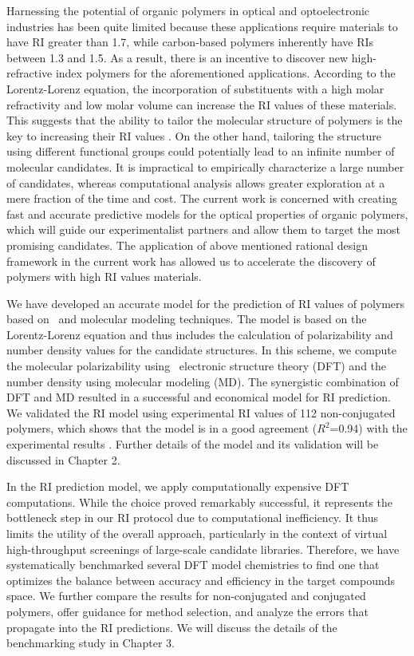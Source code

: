 Harnessing the potential of organic polymers in optical and optoelectronic industries has been quite limited because these applications require materials to have RI greater than 1.7, while carbon-based polymers inherently have RIs between 1.3 and 1.5. As a result, there is an incentive to discover new high-refractive index polymers for the aforementioned applications. According to the Lorentz-Lorenz equation, the incorporation of substituents with a high molar refractivity and low molar volume can increase the RI values of these materials. This suggests that the ability to tailor the molecular structure of polymers is the key to increasing their RI values \cite{Liu2009}. On the other hand, tailoring the structure using different functional groups could potentially lead to an infinite number of molecular candidates. It is impractical to empirically characterize a large number of candidates, whereas computational analysis allows greater exploration at a mere fraction of the time and cost. The current work is concerned with creating fast and accurate predictive models for the optical properties of organic polymers, which will guide our experimentalist partners and allow them to target the most promising candidates. The application of above mentioned rational design framework in the current work has allowed us to accelerate the discovery of polymers with high RI values materials.

We have developed an accurate model for the prediction of RI values of polymers based on \firstprinciples\ and molecular modeling techniques. The model is based on the Lorentz-Lorenz equation and thus includes the calculation of polarizability and number density values for the candidate structures. In this scheme, we compute the molecular polarizability using \firstprinciples\ electronic structure theory (DFT) and the number density using molecular modeling (MD). The synergistic combination of DFT and MD resulted in a successful and economical model for RI prediction. We validated the RI model using experimental RI values of 112 non-conjugated polymers, which shows that the model is in a good agreement ($R^2$=0.94) with the experimental results \cite{Afzal2018a}. Further details of the model and its validation will be discussed in Chapter 2.

In the RI prediction model, we apply computationally expensive DFT computations. While the choice proved remarkably successful, it represents the bottleneck step in our RI protocol due to computational inefficiency. It thus limits the utility of the overall approach, particularly in the context of virtual high-throughput screenings of large-scale candidate libraries. Therefore, we have systematically benchmarked several DFT model chemistries to find one that optimizes the balance between accuracy and efficiency in the target compounds space. We further compare the results for non-conjugated and conjugated polymers, offer guidance for method selection, and analyze the errors that propagate into the RI predictions. We will discuss the details of the benchmarking study in Chapter 3. 

